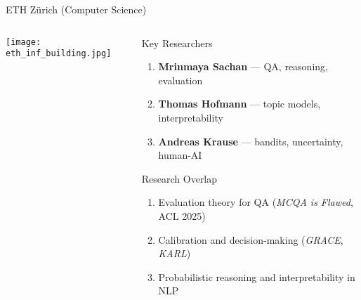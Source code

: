 \documentclass[compress]{beamer}
\begin{document}
\begin{frame}{ETH Z\"urich (Computer Science)}
\begin{columns}
  \begin{column}{0.45\textwidth}
    \texttt{[image: eth\_inf\_building.jpg]} %
  \end{column}
  \begin{column}{0.5\textwidth}
    \begin{block}{Key Researchers}
      \begin{enumerate}
        \item \textbf{Mrinmaya Sachan} — QA, reasoning, evaluation  
        \item \textbf{Thomas Hofmann} — topic models, interpretability  
        \item \textbf{Andreas Krause} — bandits, uncertainty, human-AI
      \end{enumerate}
    \end{block}

    \begin{block}{Research Overlap}
      \begin{enumerate}
        \item Evaluation theory for QA (\textit{MCQA is Flawed}, ACL 2025)
        \item Calibration and decision-making (\textit{GRACE}, \textit{KARL})
        \item Probabilistic reasoning and interpretability in NLP
      \end{enumerate}
    \end{block}
  \end{column}
\end{columns}
\end{frame}
\end{document}
